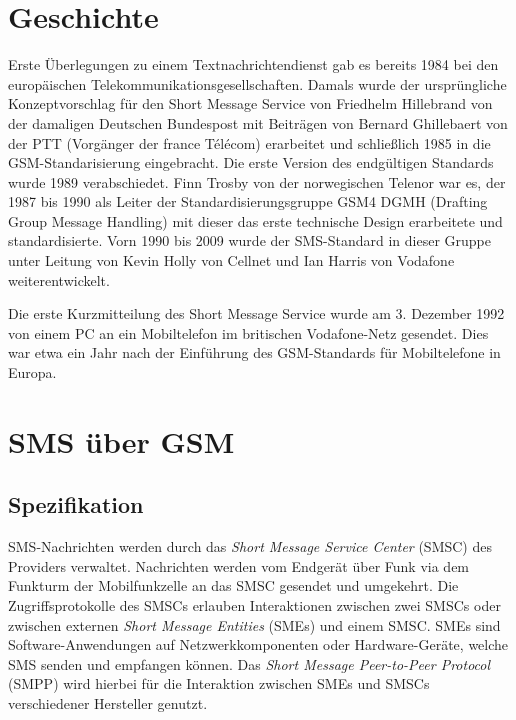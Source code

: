 \documentclass[german,12pt,a4paper]{article}
\begin{document}
\section{Geschichte}
\label{sec:geschichte}
Erste Überlegungen zu einem Textnachrichtendienst gab es bereits 1984 bei den 
europäischen Telekommunikationsgesellschaften. Damals wurde der ursprüngliche 
Konzeptvorschlag für den Short Message Service von Friedhelm Hillebrand von der 
damaligen Deutschen Bundespost mit Beiträgen von Bernard Ghillebaert von der PTT 
(Vorgänger der france Télécom) erarbeitet und schließlich 1985 in die 
GSM-Standarisierung eingebracht. Die erste Version des endgültigen Standards 
wurde 1989 verabschiedet. Finn Trosby von der norwegischen Telenor war es, der 
1987 bis 1990 als Leiter der Standardisierungsgruppe GSM4 DGMH (Drafting Group 
Message Handling) mit dieser das erste technische Design erarbeitete und 
standardisierte.
Vorn 1990 bis 2009 wurde der SMS-Standard in dieser Gruppe unter Leitung von 
Kevin Holly von Cellnet und Ian Harris von Vodafone weiterentwickelt\cite{wikipedia:sms}.

Die erste Kurzmitteilung des Short Message Service wurde am 3. Dezember 1992 
von einem PC an ein Mobiltelefon im britischen Vodafone-Netz gesendet. Dies 
war etwa ein Jahr nach der Einführung des GSM-Standards für Mobiltelefone in 
Europa.

\section{SMS über GSM} %
\label{sec:gsm}

\subsection{Spezifikation}
SMS-Nachrichten werden durch das \textit{Short Message Service Center} (SMSC) des 
Providers verwaltet. Nachrichten werden vom Endgerät über Funk via dem 
Funkturm der Mobilfunkzelle an das SMSC gesendet und umgekehrt. Die 
Zugriffsprotokolle des SMSCs erlauben Interaktionen zwischen zwei SMSCs oder 
zwischen externen \textit{Short Message Entities} (SMEs) und einem SMSC. SMEs sind 
Software-Anwendungen auf Netzwerkkomponenten oder Hardware-Geräte, welche SMS
senden und empfangen können. Das \textit{Short Message Peer-to-Peer Protocol} (SMPP) 
wird hierbei für die Interaktion zwischen SMEs und SMSCs verschiedener 
Hersteller genutzt\cite{thesms}.
\end{document}
